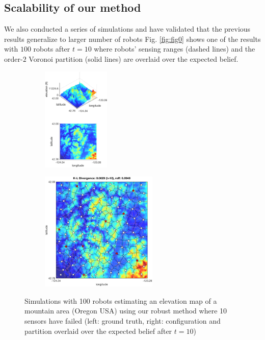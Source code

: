 \documentclass[letterpaper, 10 pt, conference]{ieeeconf}
\begin{document}
\subsection{Scalability of our method}
We also conducted a series of simulations and have validated that the previous results generalize to larger number of robots
Fig. \ref{fig:fig0} shows one of the results with $100$ robots after $t=10$ where robots' sensing ranges (dashed lines) and the order-$2$ Voronoi partition (solid lines) are overlaid over the expected belief.
\begin{figure}
	\centering
\begin{subfigure}[b]{0.17\textwidth}
	\includegraphics[width=1.27in]{figure/100_order2_last_left}
		\centering
		\caption{}
	\end{subfigure}
\begin{subfigure}[b]{0.30\textwidth}
	\includegraphics[width=2.2in]{figure/100_order2_last}
			\centering
	\caption{}
\end{subfigure}
	\caption{Simulations with 100 robots estimating an elevation map of a mountain area (Oregon USA) using our robust method where 10 sensors have failed (left: ground truth, right: configuration and partition overlaid over the expected belief after $t=10$)}
	\label{fig:fig9}
\end{figure}
\end{document}

